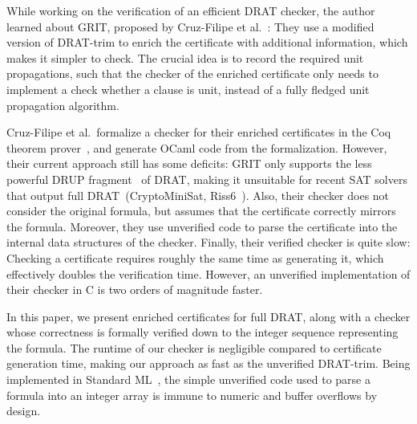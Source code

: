\documentclass{llncs}
\begin{document}
While working on the verification of an efficient DRAT checker, the author learned about GRIT, proposed by Cruz-Filipe et al.~\cite{CMS16}: They use
a modified version of DRAT-trim to enrich the certificate with additional information, which makes it simpler to check. 
The crucial idea is to record the required unit propagations, such that the checker of the enriched certificate only needs 
to implement a check whether a clause is unit, instead of a fully fledged unit propagation algorithm.

Cruz-Filipe et al.\ formalize a checker for their enriched certificates in the Coq theorem prover~\cite{BeCa10}, and generate OCaml code from the formalization. 
However, their current approach still has some deficits:
GRIT only supports the less powerful DRUP fragment~\cite{WHH13} of DRAT, making it unsuitable for recent SAT solvers that output full DRAT~(\eg CryptoMiniSat, Riss6~\cite{SATCOMP16}).
Also, their checker does not consider the original formula, but assumes that the certificate correctly mirrors the formula. 
Moreover, they use unverified code to parse the certificate into the internal data structures of the checker.
Finally, their verified checker is quite slow: Checking a certificate requires roughly the same time as generating it, which effectively doubles the verification time.
However, an unverified implementation of their checker in C is two orders of magnitude faster.


% 
% 

In this paper, we present enriched certificates for full DRAT, along with a checker whose correctness is formally verified down to the integer sequence 
representing the formula. The runtime of our checker is negligible compared to certificate generation time, making our approach as fast as the unverified DRAT-trim.
Being implemented in Standard ML~\cite{MHMT97}, the simple unverified code used to parse a formula into an integer array is immune to numeric and buffer overflows by design.
\end{document}
